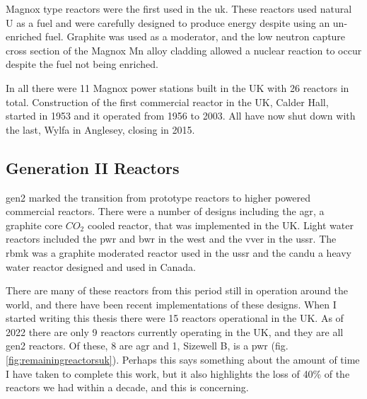 Magnox type reactors were the first used in the \acrshort{uk}.  These reactors used natural U as a fuel and were carefully designed to produce energy despite using an un-enriched fuel.  Graphite was used as a moderator, and the low neutron capture cross section of the Magnox \Gls{Mn} alloy cladding allowed a nuclear reaction to occur despite the fuel not being enriched.

In all there were 11 Magnox power stations built in the UK with 26 reactors in total.  Construction of the first commercial reactor in the UK, Calder Hall, started in 1953 and it operated from 1956 to 2003.  All have now shut down with the last, Wylfa in Anglesey, closing in 2015.

\subsection{Generation II Reactors}

\acrshort{gen2} marked the transition from prototype reactors to higher powered commercial reactors.  There were a number of designs including the \acrshort{agr}, a graphite core $CO_2$ cooled reactor, that was implemented in the UK.  Light water reactors included the \acrshort{pwr} and \acrshort{bwr} in the west and the \acrshort{vver} in the \acrshort{ussr}.  The \acrshort{rbmk} was a graphite moderated reactor used in the \acrshort{ussr} and the \acrshort{candu} a heavy water reactor designed and used in Canada.

There are many of these reactors from this period still in operation around the world, and there have been recent implementations of these designs.  When I started writing this thesis there were 15 reactors operational in the UK.  As of 2022 there are only 9 reactors currently operating in the UK, and they are all \acrshort{gen2} reactors.  Of these, 8 are \acrshort{agr} and 1, Sizewell B, is a \acrshort{pwr} (fig. \ref{fig:remainingreactorsuk}).  Perhaps this says something about the amount of time I have taken to complete this work, but it also highlights the loss of 40\% of the reactors we had within a decade, and this is concerning.

